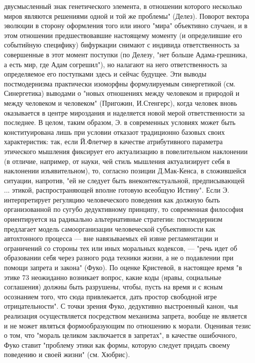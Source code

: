 \documentclass[12pt]{article}
\begin{document}
двусмысленный знак генетического элемента, в отношении которого несколько миров являются решениями
одной и той же проблемы" (Делез). Поворот вектора эволюции в сторону оформления того или иного "мира"
объективно  случаен,  и  в  этом  отношении  предшествовавшие  настоящему  моменту  (и  определившие  его
событийную специфику) бифуркации снимают с индивида ответственность за совершенные в этот момент
поступки (по Делезу, "нет больше Адама-грешника, а есть мир, где Адам согрешил"), но налагают на него
ответственность  за  определяемое  его  поступками  здесь  и  сейчас  будущее.  Эти  выводы  постмодернизма
практически  изоморфны  формулируемым  синергетикой  (см.  Синергетика)  выводами  о  "новых  отношениях
между человеком и природой и между человеком и человеком" (Пригожин, И.Стенгерс), когда человек вновь
оказывается в центре мироздания и наделяется новой мерой ответственности за последнее. В целом, таким
образом, Э. в современных условиях может быть конституирована лишь при условии отказаот традиционно
базовых своих характеристик: так, если Й.Флетчер в качестве атрибутивного параметра этического мышления
фиксирует его актуализацию в повелительном наклонении (в отличие, например, от науки, чей стиль мышления
актуализирует себя в наклонении изъявительном), то, согласно позиции Д.Мак-Кенса, в сложившейся ситуации,
напротив, "ей не следует быть внеконтекстуальной, предписывающей ... этикой, распространяющей вполне
готовую всеобщую Истину". Если Э. интерпретирует регуляцию человеческого поведения как должную быть
организованной по сугубо дедуктивному принципу, то современная философия ориентируется на радикально
альтернативные стратегии: постмодернизм предлагает модель самоорганизации человеческой субъективности
как автохтонного процесса — вне навязываемых ей извне регламентации и ограничений со стороны тех или
иных  моральных кодексов, —  "речь идет об образовании себя через разного  рода  техники жизни,  а  не о
подавлении  при  помощи  запрета  и  закона"  (Фуко).  По  оценке  Кристевой,  в  настоящее  время  "в  этике 
73
неожиданно возникает вопрос, какие коды (нравы, социальные соглашения) должны быть разрушены, чтобы,
пусть  на  время  и  с  ясным  осознанием  того,  что  сюда  привлекается,  дать  простор  свободной  игре
отрицательности".  С  точки  зрения  Фуко,  дедуктивно  выстроенный  канон,  чья  реализация  осуществляется
посредством механизма запрета, вообще не является и не может являться формообразующим по отношению к
морали. Оценивая тезис о том, что "мораль целиком заключается в запретах", в качестве ошибочного, Фуко
ставит "проблему этики как формы, которую следует придать своему поведению и своей жизни" (см. Хюбрис).
\end{document}
